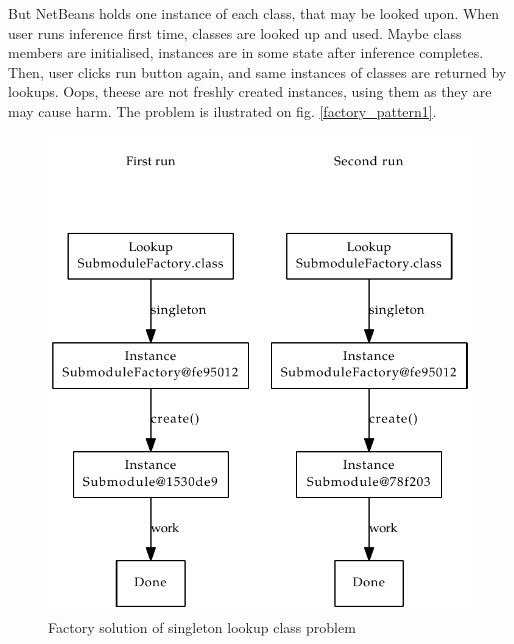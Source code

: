 \documentclass[a4paper,10pt,oneside]{article}
\newcommand{\myscale}{0.74}
\begin{document}
But NetBeans holds one instance of each class, that may be looked upon.
When user runs inference first time, classes are looked up and used.
Maybe class members are initialised, instances are in some state after inference completes.
Then, user clicks run button again, and same instances of classes are returned by lookups.
Oops, theese are not freshly created instances, using them as they are may cause harm.
The problem is ilustrated on fig. \ref{factory_pattern1}.
\begin{figure}
	\centering\includegraphics[scale=\myscale]{factory_pattern2}
	\caption{Factory solution of singleton lookup class problem} \label{factory_pattern2}
\end{figure}
\end{document}
